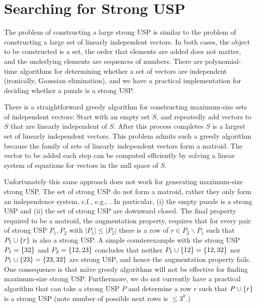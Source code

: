 \documentclass[11pt]{article}
\begin{document}
\section{Searching for Strong USP}
\label{sec:search}

The problem of constructing a large strong USP is similar to the
problem of constructing a large set of linearly independent vectors.
In both cases, the object to be constructed is a set, the order that elements
are added does not matter, and the underlying elements are sequences
of numbers.  There are polynomial-time algorithms for determining
whether a set of vectors are independent (ironically, Gaussian
elimination), and we have a practical implementation for deciding whether a
puzzle is a strong USP.

There is a straightforward greedy algorithm for constructing
maximum-size sets of independent vectors: Start with an empty set
$S$, and repeatedly add vectors to $S$ that are linearly independent
of $S$.  After this process completes $S$ is a largest set of linearly
independent vectors.  This problem admits such a greedy algorithm
because the family of sets of linearly independent vectors form a
matroid.  The vector to be added each step can be computed efficiently
by solving a linear system of equations for vectors in the null space
of $S$.


Unfortunately this same approach does not work for generating
maximum-size strong USP.  The set of strong USP do not form a
matroid, rather they only form an independence system, c.f., e.g.,
\cite{oxl06}.  In particular, (i) the empty puzzle is a strong USP and (ii) the
set of strong USP are downward closed.
The final property required to be a matroid, the augmentation
property, requires that for every pair of strong USP $P_1, P_2$ with
$|P_1| \le |P_2|$ there is a row of $r \in P_2 \backslash P_1$ such
that $P_1 \cup \left\{ r \right\}$ is also a strong USP.  A simple counterexample
with the strong USP $P_1 = \left\{ 32 \right\}$ and $P_2 = \left\{ 12, 23 \right\}$
concludes that neither $P_1 \cup \left\{ 12 \right\} = \left\{ 12, 32 \right\}$ nor $P_1
\cup \left\{ 23 \right\} = \left\{ 23, 32 \right\}$ are strong USP, and hence the
augmentation property fails.
One consequence is that na\"{i}ve greedy algorithms will not be
effective for finding maximum-size strong USP.  Furthermore, we do
not currently have a practical algorithm that can take a strong USP
$P$ and determine a row $r$ such that $P \cup \left\{ r \right\}$ is a strong
USP (note number of possible next rows is $\le 3^k$.)
\end{document}
